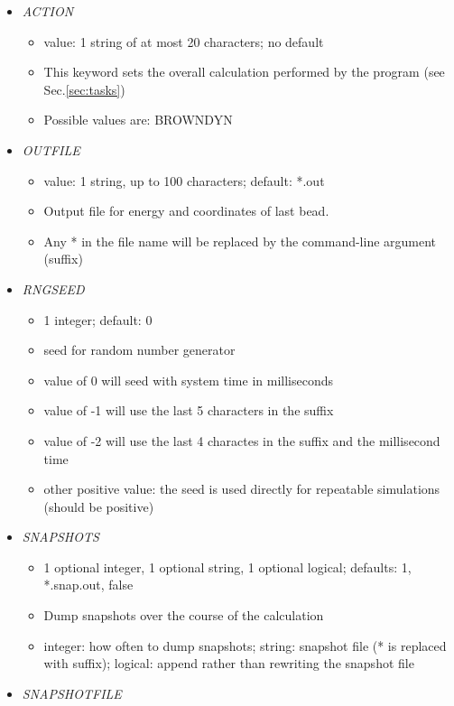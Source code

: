 \documentclass[12pt]{article}
\begin{document}
\begin{itemize}
%
\item {\it ACTION}
  \begin{itemize}
    \item  value: 1 string of at most 20 characters; no default
    \item This keyword sets the overall calculation performed by the program (see Sec.\ref{sec:tasks})
    \item Possible values are: BROWNDYN
  \end{itemize}
\item {\it OUTFILE}
    \begin{itemize}
      \item  value: 1 string, up to 100 characters; default: *.out
      \item Output file for energy and coordinates of last bead.
      \item Any * in the file name will be replaced by the command-line argument (suffix)  
      \end{itemize}
%    
\item {\it RNGSEED}
  \begin{itemize}
    \item 1 integer; default: 0
    \item seed for random number generator
    \item value of 0 will seed with system time in milliseconds
    \item value of -1 will use the last 5 characters in the suffix
    \item value of -2 will use the last 4 charactes in the suffix and the millisecond time
    \item other positive value: the seed is used directly for repeatable simulations (should be positive)
  \end{itemize}
%
\item {\it SNAPSHOTS}
  \begin{itemize}
    \item 1 optional integer, 1 optional string, 1 optional logical; defaults: 1, *.snap.out, false 
    \item Dump snapshots over the course of the calculation
    \item integer: how often to dump snapshots; string: snapshot file (* is replaced with suffix); logical: append rather than rewriting the snapshot file
   \end{itemize}
%
\item {\it SNAPSHOTFILE}
    \begin{itemize}

\end{itemize}
\end{itemize}
\end{document}
